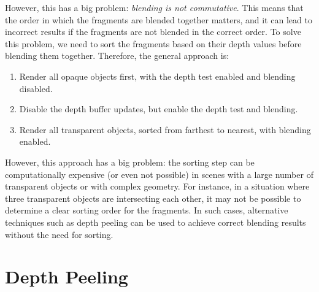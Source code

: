 However, this has a big problem: \emph{blending is not commutative}. This means that the order in which the fragments are blended together matters, and it can lead to incorrect results if the fragments are not blended in the correct order. To solve this problem, we need to sort the fragments based on their depth values before blending them together. Therefore, the general approach is:
\begin{enumerate}
    \item Render all opaque objects first, with the depth test enabled and blending disabled.
    \item Disable the depth buffer updates, but enable the depth test and blending.
    \item Render all transparent objects, sorted from farthest to nearest, with blending enabled.
\end{enumerate}

However, this approach has a big problem: the sorting step can be computationally expensive (or even not possible) in scenes with a large number of transparent objects or with complex geometry. For instance, in a situation where three transparent objects are intersecting each other, it may not be possible to determine a clear sorting order for the fragments. In such cases, alternative techniques such as depth peeling can be used to achieve correct blending results without the need for sorting.

\section{Depth Peeling}

